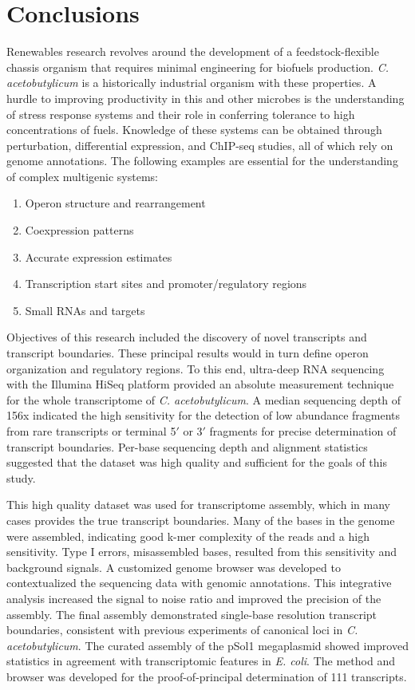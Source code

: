 
\chapter{Conclusions}

Renewables research revolves around the development of a feedstock-flexible chassis organism that requires minimal engineering for biofuels production. \textit{C. acetobutylicum} is a historically industrial organism with these properties. A hurdle to improving productivity in this and other microbes is the understanding of stress response systems and their role in conferring tolerance to high concentrations of fuels. Knowledge of these systems can be obtained through perturbation, differential expression, and ChIP-seq studies, all of which rely on genome annotations. The following examples are essential for the understanding of complex multigenic systems:

\begin{enumerate}
\item Operon structure and rearrangement
\item Coexpression patterns
\item Accurate expression estimates
\item Transcription start sites and promoter/regulatory regions
\item Small RNAs and targets
\end{enumerate}

Objectives of this research included the discovery of novel transcripts and transcript boundaries. These principal results would in turn define operon organization and regulatory regions. To this end, ultra-deep RNA sequencing with the Illumina HiSeq platform\cite{88} provided an absolute measurement technique for the whole transcriptome of \textit{C. acetobutylicum}. A median sequencing depth of 156x indicated the high sensitivity for the detection of low abundance fragments from rare transcripts or terminal 5$\prime$ or 3$\prime$ fragments for precise determination of transcript boundaries. Per-base sequencing depth and alignment statistics suggested that the dataset was high quality and sufficient for the goals of this study.

This high quality dataset was used for transcriptome assembly, which in many cases provides the true transcript boundaries. Many of the bases in the genome were assembled, indicating good k-mer complexity of the reads and a high sensitivity. Type I errors, misassembled bases, resulted from this sensitivity and background signals. A customized genome browser was developed to contextualized the sequencing data with genomic annotations. This integrative analysis increased the signal to noise ratio and improved the precision of the assembly. The final assembly demonstrated single-base resolution transcript boundaries, consistent with previous experiments of canonical loci in \textit{C. acetobutylicum}. The curated assembly of the pSol1 megaplasmid showed improved statistics in agreement with transcriptomic features in \textit{E. coli}. The method and browser was developed for the proof-of-principal determination of 111 transcripts.